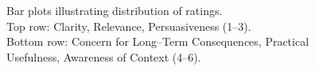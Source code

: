 \begin{figure}[t]
  \caption{
    Bar plots illustrating distribution of ratings.\\
    Top row: Clarity, Relevance, Persuasiveness (1–3).\\
    Bottom row: Concern for Long--Term Consequences, Practical Usefulness, Awareness of Context (4–6).
  }
  \label{fig:Distribution of Ratings per Dimension}
\end{figure}
